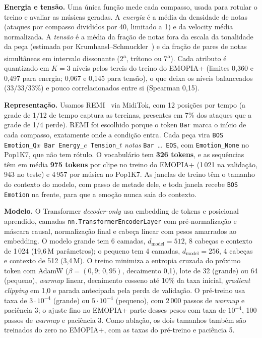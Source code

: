\documentclass{article}
\begin{document}
\textbf{Energia e tensão.} Uma única função mede cada compasso, usada para rotular o treino e avaliar as músicas geradas. A \emph{energia} é a média da densidade de notas (ataques por compasso divididos por 40, limitado a 1) e da velocity média normalizada. A \emph{tensão} é a média da fração de notas fora da escala da tonalidade da peça (estimada por Krumhansl--Schmuckler~\cite{krumhansl1990}) e da fração de pares de notas simultâneas em intervalo dissonante (2\textsuperscript{a}, trítono ou 7\textsuperscript{a}). Cada atributo é quantizado em $K=3$ níveis pelos tercis do treino do EMOPIA+ (limites 0,360 e 0,497 para energia; 0,067 e 0,145 para tensão), o que deixa os níveis balanceados (33/33/33\%) e pouco correlacionados entre si (Spearman 0,15).

\textbf{Representação.} Usamos REMI~\cite{huang2020pop} via MidiTok, com 12 posições por tempo (a grade de 1/12 de tempo captura as tercinas, presentes em 7\% dos ataques que a grade de 1/4 perde). REMI foi escolhido porque o token \texttt{Bar} marca o início de cada compasso, exatamente onde a condição entra. Cada peça vira
\texttt{BOS Emotion\_Q$x$ Bar Energy\_$e$ Tension\_$t$} \emph{notas} \texttt{Bar}~\ldots~\texttt{EOS}, com \texttt{Emotion\_None} no Pop1K7, que não tem rótulo. O vocabulário tem \textbf{326 tokens}, e as sequências têm em média \textbf{975 tokens} por clipe no treino do EMOPIA+ (1\,021 na validação, 943 no teste) e 4\,957 por música no Pop1K7. As janelas de treino têm o tamanho do contexto do modelo, com passo de metade dele, e toda janela recebe \texttt{BOS Emotion} na frente, para que a emoção nunca saia do contexto.

\textbf{Modelo.} O Transformer \emph{decoder-only} usa embedding de tokens e posicional aprendido, camadas \texttt{nn.TransformerEncoderLayer} com pré-normalização e máscara causal, normalização final e cabeça linear com pesos amarrados ao embedding. O modelo grande tem 6 camadas, $d_{\text{model}}=512$, 8 cabeças e contexto de 1\,024 (19,6\,M parâmetros); o pequeno tem 4 camadas, $d_{\text{model}}=256$, 4 cabeças e contexto de 512 (3,4\,M). O treino minimiza a entropia cruzada do próximo token com AdamW ($\beta=(0{,}9;\,0{,}95)$, decaimento 0,1), lote de 32 (grande) ou 64 (pequeno), \emph{warmup} linear, decaimento cosseno até 10\% da taxa inicial, \emph{gradient clipping} em 1,0 e parada antecipada pela perda de validação. O pré-treino usa taxa de $3\cdot10^{-4}$ (grande) ou $5\cdot10^{-4}$ (pequeno), com 2\,000 passos de \emph{warmup} e paciência 3; o ajuste fino no EMOPIA+ parte desses pesos com taxa de $10^{-4}$, 100 passos de \emph{warmup} e paciência 3. Como ablação, os dois tamanhos também são treinados do zero no EMOPIA+, com as taxas do pré-treino e paciência 5.
\end{document}
